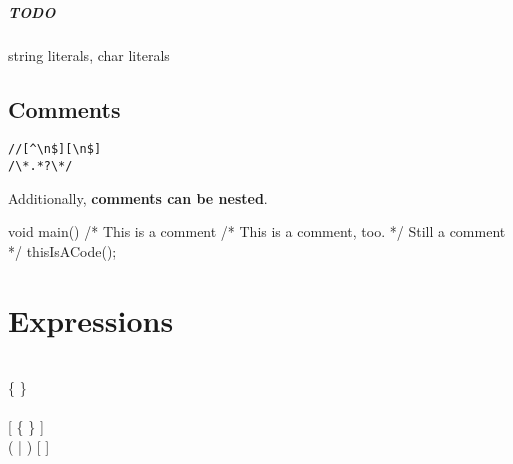 \paragraph{TODO} string literals, char literals

\section{Comments}
\begin{grammar}
	 \verb|//[^\n$][\n$]| \\
	 \verb|/\*.*?\*/|
\end{grammar}
Additionally, \textbf{comments can be nested}.

\begin{code}
void main() {
	/* This is a comment
		/* This is a comment, too. */
		Still a comment */
	thisIsACode();
}
\end{code}

\chapter{Expressions}
\begin{grammar}
	  \\
	  \{ \kwd{,}  \} \\
	
	\\
	
	 \kwd{(} [  \{ \kwd{,}  \} ] \kwd{)} \\
	 (  |  ) [  ] \\
	
\end{grammar}

